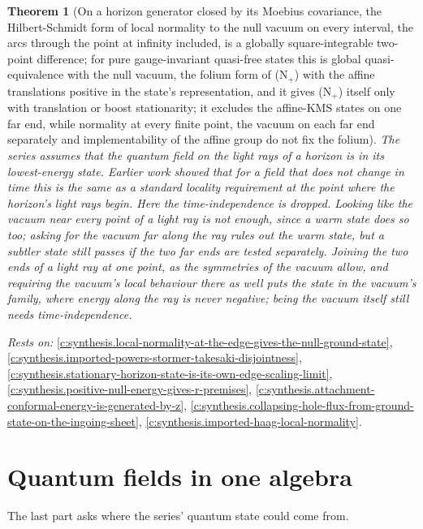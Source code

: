 \documentclass[11pt]{article}
\newtheorem{theorem}{Theorem}[section]
\theoremstyle{definition}
\theoremstyle{plain}
\begin{document}
\begin{theorem}[On a horizon generator closed by its Moebius covariance, the Hilbert-Schmidt form of local normality to the null vacuum on every interval, the arcs through the point at infinity included, is a globally square-integrable two-point difference; for pure gauge-invariant quasi-free states this is global quasi-equivalence with the null vacuum, the folium form of (N$_{+}$) with the affine translations positive in the state's representation, and it gives (N$_{+}$) itself only with translation or boost stationarity; it excludes the affine-KMS states on one far end, while normality at every finite point, the vacuum on each far end separately and implementability of the affine group do not fix the folium]\label{c:synthesis.normality-on-the-closed-generator-gives-the-vacuum-folium-not-the-ground-state}
The series assumes that the quantum field on the light rays of a horizon is in its lowest-energy state. Earlier work showed that for a field that does not change in time this is the same as a standard locality requirement at the point where the horizon's light rays begin. Here the time-independence is dropped. Looking like the vacuum near every point of a light ray is not enough, since a warm state does so too; asking for the vacuum far along the ray rules out the warm state, but a subtler state still passes if the two far ends are tested separately. Joining the two ends of a light ray at one point, as the symmetries of the vacuum allow, and requiring the vacuum's local behaviour there as well puts the state in the vacuum's family, where energy along the ray is never negative; being the vacuum itself still needs time-independence.
\end{theorem}
\noindent\emph{Rests on:} \ref{c:synthesis.local-normality-at-the-edge-gives-the-null-ground-state}, \ref{c:synthesis.imported-powers-stormer-takesaki-disjointness}, \ref{c:synthesis.stationary-horizon-state-is-its-own-edge-scaling-limit}, \ref{c:synthesis.positive-null-energy-gives-r-premises}, \ref{c:synthesis.attachment-conformal-energy-is-generated-by-z}, \ref{c:synthesis.collapsing-hole-flux-from-ground-state-on-the-ingoing-sheet}, \ref{c:synthesis.imported-haag-local-normality}.

\section{Quantum fields in one algebra}

The last part asks where the series' quantum state could come from.
\end{document}
